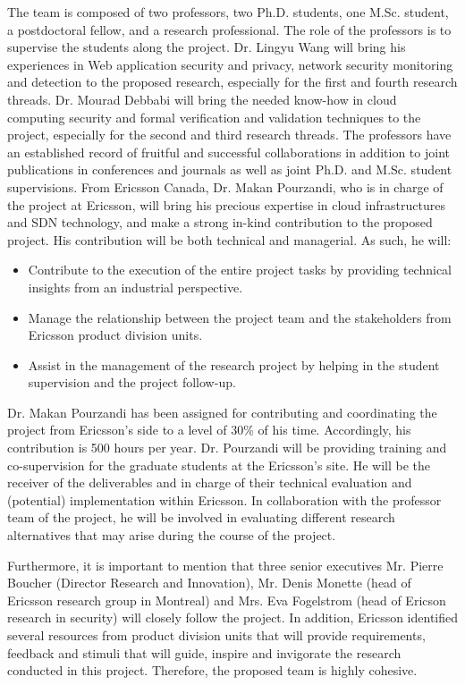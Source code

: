 \documentclass[12pt]{article}
\begin{document}
The team is composed of two professors, two Ph.D. students, one
M.Sc. student, a postdoctoral fellow, and a research professional. The
role of the professors is to supervise the students along the
project. Dr. Lingyu Wang will bring his experiences in Web application
security and privacy, network security monitoring and detection to the
proposed research, especially for the first and fourth research
threads.  Dr. Mourad Debbabi will bring the needed know-how in cloud
computing security and formal verification and validation techniques
to the project, especially for the second and third research
threads. The professors have an established record of fruitful and
successful collaborations in addition to joint publications in
conferences and journals as well as joint Ph.D. and M.Sc. student
supervisions. From Ericsson Canada, Dr. Makan Pourzandi, who is in
charge of the project at Ericsson, will bring his precious expertise
in cloud infrastructures and SDN technology, and make a strong in-kind
contribution to the proposed project. His contribution will be both
technical and managerial. As such, he will:

\vspace{-3mm}
\begin{itemize}
\addtolength{\itemsep}{-0.5\baselineskip}
\item	Contribute to the execution of the entire project tasks by providing technical insights from an industrial perspective. 
\item	Manage the relationship between the project team and the stakeholders from Ericsson product division units. 
\item	Assist in the management of the research project by helping in the student supervision and the project follow-up. 
\end{itemize}
\vspace{-3mm} Dr. Makan Pourzandi has been assigned for contributing
and coordinating the project from Ericsson's side to a level of 30\%
of his time. Accordingly, his contribution is 500 hours per
year. Dr. Pourzandi will be providing training and co-supervision for
the graduate students at the Ericsson's site. He will be the receiver
of the deliverables and in charge of their technical evaluation and
(potential) implementation within Ericsson. In collaboration with the
professor team of the project, he will be involved in
evaluating different research alternatives that may arise during the
course of the project.

Furthermore, it is important to mention that three senior executives
Mr. Pierre Boucher (Director Research and Innovation), Mr. Denis
Monette (head of Ericsson research group in Montreal) and Mrs. Eva
Fogelstrom (head of Ericson research in security) will closely follow
the project. In addition, Ericsson identified several resources from
product division units that will provide requirements, feedback and
stimuli that will guide, inspire and invigorate the research conducted
in this project. Therefore, the proposed team is highly cohesive.
	
\end{document}
